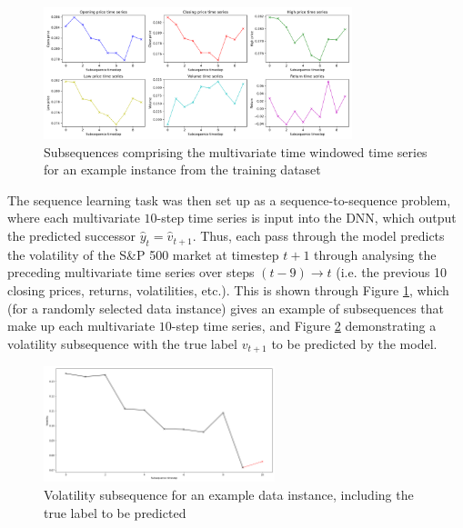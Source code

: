 \documentclass[a4paper, 11pt]{report}
\begin{document}
    \begin{figure}[ht]
        \centering
        \includegraphics[width=0.8\textwidth]{subsequences.png}
        \caption{\centering Subsequences comprising the multivariate time windowed time series for an example instance from the training dataset}
        \label{fig: subsequences}
    \end{figure}


    The sequence learning task was then set up as a sequence-to-sequence problem, where each multivariate $10$-step time series is input into the DNN, which output the predicted successor $\hat{y}_t = \hat{v}_{t+1}$. Thus, each pass through the model predicts the volatility of the S\&P 500 market at timestep $t+1$ through analysing the preceding multivariate time series over steps $(t-9) \to t$ (i.e. the previous 10 closing prices, returns, volatilities, etc.). This is shown through Figure \ref{fig: subsequences}, which (for a randomly selected data instance) gives an example of subsequences that make up each multivariate $10$-step time series, and Figure \ref{fig: volatility-subsequence} demonstrating a volatility subsequence with the true label $v_{t+1}$ to be predicted by the model.


    \begin{figure}[ht]
        \centering
        \includegraphics[width=0.6\textwidth]{volatility-subsequence.png}
        \caption{\centering Volatility subsequence for an example data instance, including the true label to be predicted}
        \label{fig: volatility-subsequence}
    \end{figure}
\end{document}
